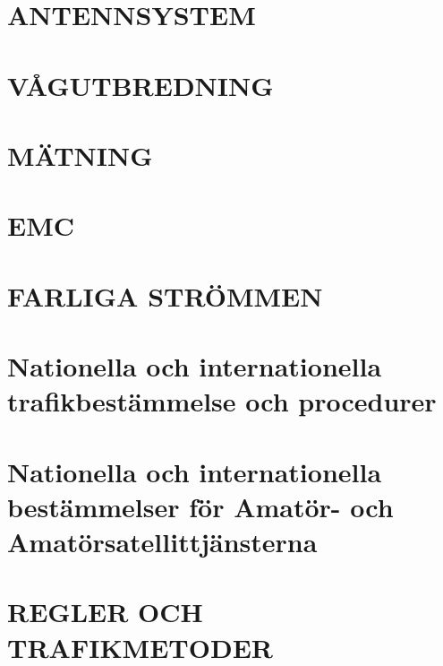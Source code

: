 \documentclass[a4paper,twoside,twocolumn,openright]{book}
\begin{document}
\chapter{ANTENNSYSTEM}







\chapter{VÅGUTBREDNING}






\chapter{MÄTNING}



\chapter{EMC}





\chapter{FARLIGA STRÖMMEN}







\chapter{Nationella och internationella trafikbestämmelse och procedurer}







\chapter{Nationella och internationella bestämmelser för Amatör- och
  Amatörsatellittjänsterna}




\chapter{REGLER OCH TRAFIKMETODER}

\end{document}
